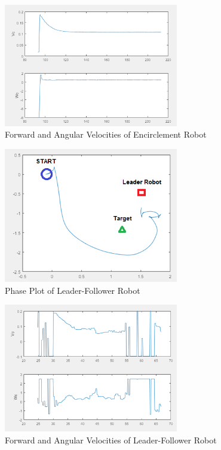 \documentclass[conference]{IEEEtran}
\begin{document}
\begin{figure}[htbp]
\begin{center}
\includegraphics[width=3in]{12}
\caption{Forward and Angular Velocities of Encirclement Robot} \label{fig:12}
\end{center}
\end{figure}

\begin{figure}[htbp]
\begin{center}
\includegraphics[width=3in]{13}
\caption{Phase Plot of Leader-Follower Robot} \label{fig:13}
\end{center}
\end{figure}

\begin{figure}[htbp]
\begin{center}
\includegraphics[width=3in]{14}
\caption{Forward and Angular Velocities of Leader-Follower Robot} \label{fig:14}
\end{center}
\end{figure}
\end{document}
